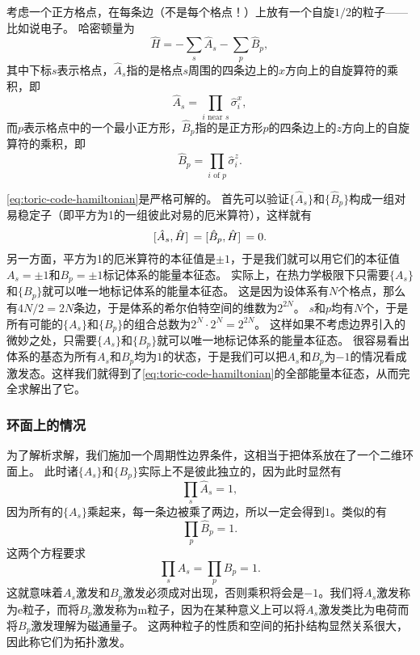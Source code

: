 \documentclass[hyperref, UTF8, a4paper]{ctexart}
\begin{document}
考虑一个正方格点，在每条边（不是每个格点！）上放有一个自旋$1/2$的粒子——比如说电子。
哈密顿量为
\begin{equation}
    \hat{H} = - \sum_s \hat{A}_s - \sum_p \hat{B}_p,
    \label{eq:toric-code-hamiltonian}
\end{equation}
其中下标$s$表示格点，$\hat{A}_s$指的是格点$s$周围的四条边上的$x$方向上的自旋算符的乘积，即
\begin{equation}
    \hat{A}_s = \prod_{i\text{ near } s} \hat{\sigma}_i^x,
\end{equation}
而$p$表示格点中的一个最小正方形，$\hat{B}_p$指的是正方形$p$的四条边上的$z$方向上的自旋算符的乘积，即
\begin{equation}
    \hat{B}_p = \prod_\text{$i$ of $p$} \hat{\sigma}_i^z.
\end{equation}

\eqref{eq:toric-code-hamiltonian}是严格可解的。
首先可以验证$\{\hat{A}_s\}$和$\{\hat{B}_p\}$构成一组对易稳定子（即平方为1的一组彼此对易的厄米算符），这样就有
\begin{equation}
    \comm*{\hat{A}_s}{\hat{H}} = \comm*{\hat{B}_p}{\hat{H}} = 0.
\end{equation}
另一方面，平方为1的厄米算符的本征值是$\pm 1$，于是我们就可以用它们的本征值$A_s = \pm 1$和$B_p = \pm 1$标记体系的能量本征态。
实际上，在热力学极限下只需要$\{A_s\}$和$\{B_p\}$就可以唯一地标记体系的能量本征态。
这是因为设体系有$N$个格点，那么有$4N/2=2N$条边，于是体系的希尔伯特空间的维数为$2^{2N}$。
$s$和$p$均有$N$个，于是所有可能的$\{A_s\}$和$\{B_p\}$的组合总数为$2^N \cdot 2^N=2^{2N}$。
这样如果不考虑边界引入的微妙之处，只需要$\{A_s\}$和$\{B_p\}$就可以唯一地标记体系的能量本征态。
很容易看出体系的基态为所有$A_s$和$B_p$均为$1$的状态，于是我们可以把$A_s$和$B_p$为$-1$的情况看成激发态。这样我们就得到了\eqref{eq:toric-code-hamiltonian}的全部能量本征态，从而完全求解出了它。

\subsubsection{环面上的情况}

为了解析求解，我们施加一个周期性边界条件，这相当于把体系放在了一个二维环面上。
此时诸$\{A_s\}$和$\{B_p\}$实际上不是彼此独立的，因为此时显然有
\[
    \prod_s \hat{A}_s = 1,
\]
因为所有的$\{A_s\}$乘起来，每一条边被乘了两边，所以一定会得到$1$。类似的有
\[
    \prod_p \hat{B}_p = 1.
\]
这两个方程要求
\begin{equation}
    \prod_{s} A_s = \prod_{p} B_p = 1.
    \label{eq:toric-code-pair-condition}
\end{equation}
这就意味着$A_s$激发和$B_p$激发必须成对出现，否则乘积将会是$-1$。我们将$A_s$激发称为e粒子，而将$B_p$激发称为m粒子，因为在某种意义上可以将$A_s$激发类比为电荷而将$B_p$激发理解为磁通量子。
这两种粒子的性质和空间的拓扑结构显然关系很大，因此称它们为拓扑激发。
\end{document}
